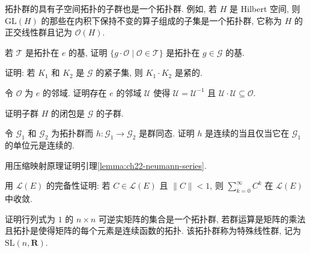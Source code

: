 \documentclass[../../main.tex]{subfiles}
\begin{document}
拓扑群的具有子空间拓扑的子群也是一个拓扑群. 例如, 若 $H$ 是 Hilbert 空间, 则 $\mathrm{GL}(H)$ 的那些在内积下保持不变的算子组成的子集是一个拓扑群, 它称为 $H$ 的正交线性群且记为 $\mathcal{O}(H)$.

\begin{exercise}\label{exercise:ch22-01}
若 $\mathcal{T}$ 是拓扑在 $e$ 的基, 证明 $\{g\cdot\mathcal{O}\mid\mathcal{O}\in\mathcal{T}\}$ 是拓扑在 $g\in\mathcal{G}$ 的基.
\end{exercise}

\begin{exercise}\label{exercise:ch22-02}
证明: 若 $K_{1}$ 和 $K_{2}$ 是 $\mathcal{G}$ 的紧子集, 则 $K_{1}\cdot K_{2}$ 是紧的.
\end{exercise}

\begin{exercise}\label{exercise:ch22-03}
令 $\mathcal{O}$ 为 $e$ 的邻域. 证明存在 $e$ 的邻域 $\mathcal{U}$ 使得 $\mathcal{U}=\mathcal{U}^{-1}$ 且 $\mathcal{U}\cdot\mathcal{U}\subseteq\mathcal{O}$.
\end{exercise}

\begin{exercise}\label{exercise:ch22-04}
证明子群 $H$ 的闭包是 $\mathcal{G}$ 的子群.
\end{exercise}

\begin{exercise}\label{exercise:ch22-05}
令 $\mathcal{G}_{1}$ 和 $\mathcal{G}_{2}$ 为拓扑群而 $h:\mathcal{G}_{1}\to\mathcal{G}_{2}$ 是群同态. 证明 $h$ 是连续的当且仅当它在 $\mathcal{G}_{1}$ 的单位元是连续的.
\end{exercise}

\begin{exercise}\label{exercise:ch22-06}
用压缩映射原理证明引理\cref{lemma:ch22-neumann-series}.
\end{exercise}

\begin{exercise}\label{exercise:ch22-07}
用 $\mathcal{L}(E)$ 的完备性证明: 若 $C\in\mathcal{L}(E)$ 且 $\|C\|<1$, 则 $\sum_{k=0}^{\infty}C^{k}$ 在 $\mathcal{L}(E)$ 中收敛.
\end{exercise}

\begin{exercise}\label{exercise:ch22-08}
证明行列式为 $1$ 的 $n\times n$ 可逆实矩阵的集合是一个拓扑群, 若群运算是矩阵的乘法且拓扑是使得矩阵的每个元素是连续函数的拓扑. 该拓扑群称为特殊线性群, 记为 $\mathrm{SL}(n,\mathbf{R})$.
\end{exercise}
\end{document}
